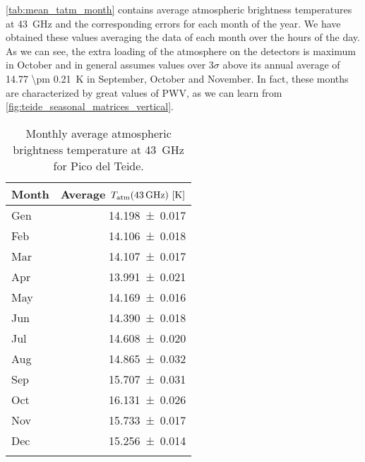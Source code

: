 \autoref{tab:mean_tatm_month} contains average atmospheric brightness
temperatures at \SI{43}{\giga\hertz} and the corresponding errors for each
month of the year. We have obtained these values averaging the data of each
month over the hours of the day. As we can see, the extra loading of the
atmosphere on the detectors is maximum in October and in general assumes
values over $3\sigma$ above its annual average of \SI{14.77 \pm
0.21}{\kelvin} in September, October and November. In fact, these months
are characterized by great values of PWV, as we can learn from
\autoref{fig:teide_seasonal_matrices_vertical}.

\begin{table}
        \renewcommand{\arraystretch}{1.5}
        \centering
        \begin{tabular}{p{5cm} r}
                \hline
                Month & Average $T_\text{atm}\qty(\SI{43}{\giga\hertz})\
                \qty[\si{\kelvin}]$ \\
                \hline
                \hline
                Gen \dotfill & \num{14.198 \pm 0.017} \\
                Feb \dotfill & \num{14.106 \pm 0.018} \\
                Mar \dotfill & \num{14.107 \pm 0.017} \\
                Apr \dotfill & \num{13.991 \pm 0.021} \\
                May \dotfill & \num{14.169 \pm 0.016} \\
                Jun \dotfill & \num{14.390 \pm 0.018} \\
                Jul \dotfill & \num{14.608 \pm 0.020} \\
                Aug \dotfill & \num{14.865 \pm 0.032} \\
                Sep \dotfill & \num{15.707 \pm 0.031} \\
                Oct \dotfill & \num{16.131 \pm 0.026} \\
                Nov \dotfill & \num{15.733 \pm 0.017} \\
                Dec \dotfill & \num{15.256 \pm 0.014} \\
                \noalign{\smallskip}
                \hline
        \end{tabular}
        \caption{Monthly average atmospheric brightness temperature at
        \SI{43}{\giga\hertz} for Pico del Teide.}
        \label{tab:mean_tatm_month}
\end{table}

